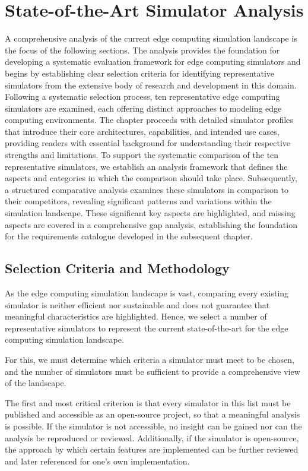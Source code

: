 \chapter{State-of-the-Art Simulator Analysis}
A comprehensive analysis of the current edge computing simulation landscape is the focus of the following sections.
The analysis provides the foundation for developing a systematic evaluation framework for edge computing simulators and begins by establishing
clear selection criteria for identifying representative simulators from the extensive body of research and development in this domain.
Following a systematic selection process, ten representative edge computing simulators are examined, each offering distinct approaches to modeling edge computing environments.
The chapter proceeds with detailed simulator profiles that introduce their core architectures, capabilities, and intended use cases, providing readers with essential background for understanding their respective strengths and limitations.
To support the systematic comparison of the ten representative simulators, we establish an analysis framework that defines the aspects and categories in which the comparison should take place.
Subsequently, a structured comparative analysis examines these simulators in comparison to their competitors, revealing significant patterns and variations within the simulation landscape.
These significant key aspects are highlighted, and missing aspects are covered in a comprehensive gap analysis, establishing the foundation for the requirements catalogue developed in the subsequent chapter.

\section{Selection Criteria and Methodology}
As the edge computing simulation landscape is vast, comparing every existing simulator is neither efficient nor sustainable and does not guarantee that meaningful characteristics are highlighted.
Hence, we select a number of representative simulators to represent the current state-of-the-art for the edge computing simulation landscape.

For this, we must determine which criteria a simulator must meet to be chosen, and the number of simulators must be sufficient to provide a comprehensive view of the landscape.

The first and most critical criterion is that every simulator in this list must be published and accessible as an open-source project, so that a meaningful analysis is possible.
If the simulator is not accessible, no insight can be gained nor can the analysis be reproduced or reviewed. 
Additionally, if the simulator is open-source, the approach by which certain features are implemented can be further reviewed and later referenced for one's own implementation.

